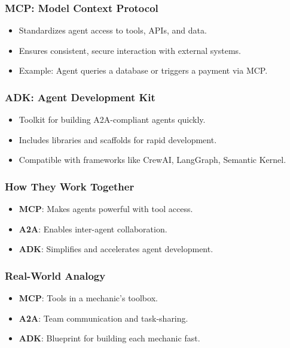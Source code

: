 \begin{frame}[fragile]\frametitle{MCP: Model Context Protocol}
    \begin{itemize}
        \item Standardizes agent access to tools, APIs, and data.
        \item Ensures consistent, secure interaction with external systems.
        \item Example: Agent queries a database or triggers a payment via MCP.
    \end{itemize}
\end{frame}

\begin{frame}[fragile]\frametitle{ADK: Agent Development Kit}
    \begin{itemize}
        \item Toolkit for building A2A-compliant agents quickly.
        \item Includes libraries and scaffolds for rapid development.
        \item Compatible with frameworks like CrewAI, LangGraph, Semantic Kernel.
    \end{itemize}
\end{frame}

\begin{frame}[fragile]\frametitle{How They Work Together}
    \begin{itemize}
        \item \textbf{MCP}: Makes agents powerful with tool access.
        \item \textbf{A2A}: Enables inter-agent collaboration.
        \item \textbf{ADK}: Simplifies and accelerates agent development.
    \end{itemize}
\end{frame}

\begin{frame}[fragile]\frametitle{Real-World Analogy}
    \begin{itemize}
        \item \textbf{MCP}: Tools in a mechanic's toolbox.
        \item \textbf{A2A}: Team communication and task-sharing.
        \item \textbf{ADK}: Blueprint for building each mechanic fast.
    \end{itemize}
\end{frame}

